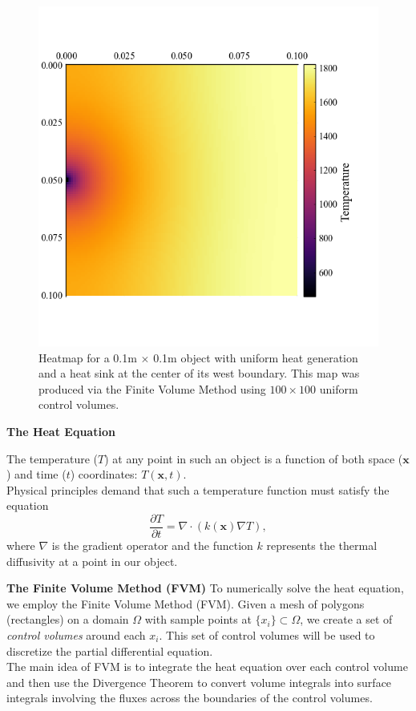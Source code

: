 \documentclass[final]{beamer}
\begin{document}
\begin{frame}
	\begin{figure}
		\centering
		\includegraphics[height=0.65\textwidth]{Heatmap_Example.png}
		\caption[Heatmap Example]{Heatmap for a 0.1m $\times$ 0.1m object with uniform heat generation and a heat sink at the center of its west boundary. This map was produced via the Finite Volume Method using $100\times 100$ uniform control volumes.}
		\label{fig:heatmap-example}
	\end{figure}
\end{frame}

\begin{frame}{\textbf{The Heat Equation}}

The temperature ($T$) at any point in such an object is a function of both space ($\mathbf{x}$) and time ($t$) coordinates: $T(\mathbf{x},t)$.\\\vspace{1em}\pause
Physical principles demand that such a temperature function must satisfy the equation
\begin{equation}
	\frac{\partial T}{\partial t}=\nabla\cdot\left(k(\mathbf{x})\nabla T\right)\label{eqn:HeatEq},
\end{equation}
where $\nabla$ is the gradient operator and the function $k$ represents the thermal diffusivity at a point in our object.
\end{frame}

\begin{frame}[t]{\bf The Finite Volume Method (FVM)}
	To numerically solve the heat equation, we employ the Finite Volume Method (FVM).\pause
	\vfill
	Given a mesh of polygons (rectangles) on a domain $\Omega$ with sample points at $\lbrace x_i\rbrace\subset\Omega$, we create a set of \textit{control volumes} around each $x_i$. This set of control volumes will be used to discretize the partial differential equation.\\\vfill\pause
	The main idea of FVM is to integrate the heat equation over each control volume and then use the Divergence Theorem to convert volume integrals into surface integrals involving the fluxes across the boundaries of the control volumes.
	\vfill
\end{frame}
\end{document}

